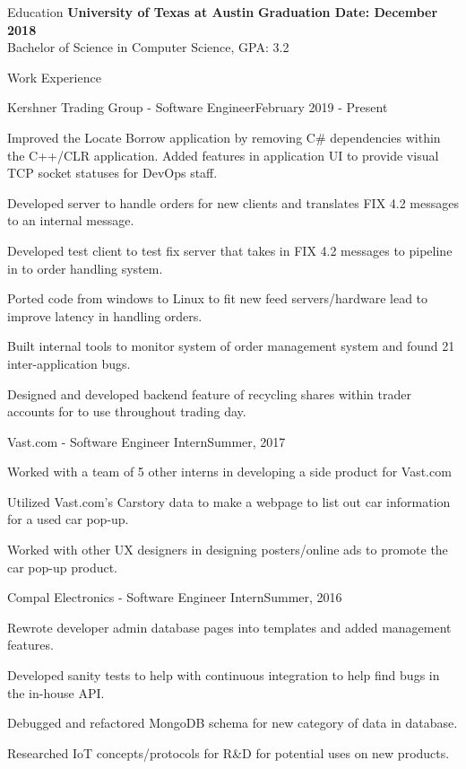 \documentclass{resume} %
\begin{document}
\begin{rSection}{\large Education}
{\bf University of Texas at Austin} \hfill {\bf Graduation Date: December 2018} \\
\/ Bachelor of Science in Computer Science, GPA: 3.2

\end{rSection}

\begin{rSection}{\large Work Experience}

\begin{rSubsection}{Kershner Trading Group - Software Engineer}{February 2019 - Present}{}{}
\item Improved the Locate Borrow application by removing C\# dependencies within the C++/CLR application. Added features in application UI to provide visual TCP socket statuses for DevOps staff.
\item Developed server to handle orders for new clients and translates FIX 4.2 messages to an internal message.
\item Developed test client to test fix server that takes in FIX 4.2 messages to pipeline in to order handling system.
\item Ported code from windows to Linux to fit new feed servers/hardware lead to improve latency in handling orders.
\item Built internal tools to monitor system of order management system and found 21 inter-application bugs.
\item Designed and developed backend feature of recycling shares within trader accounts for to use throughout trading day. 
\end{rSubsection}

\begin{rSubsection}{Vast.com - Software Engineer Intern}{Summer, 2017}{}{}
\item Worked with a team of 5 other interns in developing a side product for Vast.com
\item Utilized Vast.com's Carstory data to make a webpage to list out car 
    information for a used car pop-up.
\item Worked with other UX designers in designing posters/online ads to promote
    the car pop-up product.
\end{rSubsection}

\begin{rSubsection}{Compal Electronics - Software Engineer Intern}{Summer, 2016}{}{}
\item Rewrote developer admin database pages into templates and added management features.
\item Developed sanity tests to help with continuous integration to help find bugs in the in-house API.
\item Debugged and refactored MongoDB schema for new category of data in database. 
\item Researched IoT concepts/protocols for R\&D for potential uses on new products.
\end{rSubsection}


\end{rSection}
\end{document}
